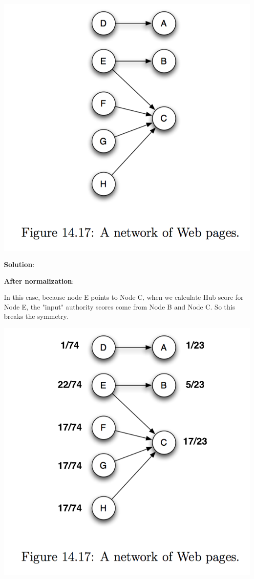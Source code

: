 \documentclass[a4paper]{article}
\begin{document}
\begin{center}
  \includegraphics[scale=0.5]{fig2.png}
\end{center}

\textbf{Solution}:

\textbf{After normalization}:

In this case, because node E points to Node C, when we calculate Hub score for Node E, the "input" authority scores come from Node B and Node C. So this breaks the symmetry.

\begin{center}
  \includegraphics[scale=0.5]{fig2-norm.png}
\end{center}
\end{document}
